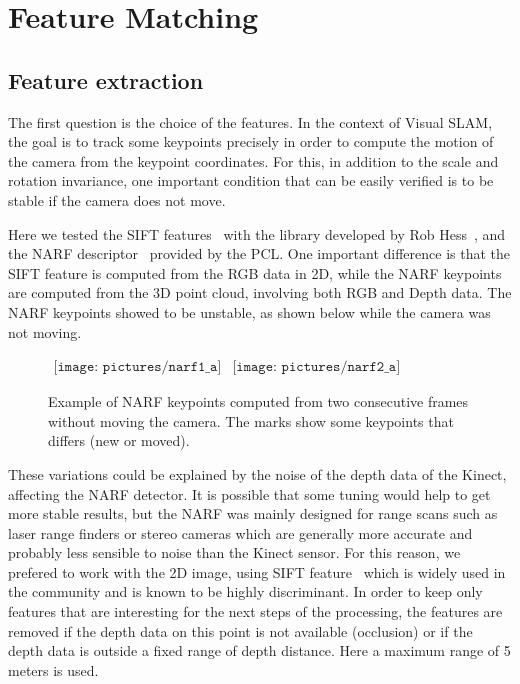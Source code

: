 \chapter{Feature Matching}
\label{chap:features}

\section{Feature extraction}

The first question is the choice of the features. In the context of Visual SLAM, the goal is to track some keypoints precisely in order to compute the motion of the camera from the keypoint coordinates. For this, in addition to the scale and rotation invariance, one important condition that can be easily verified is to be stable if the camera does not move. 

Here we tested the SIFT features~\cite{lowe_2004_sift} with the library developed by Rob Hess~\cite{hess_sift}, and the NARF descriptor~\cite{steder10irosws} provided by the PCL. One important difference is that the SIFT feature is computed from the RGB data in 2D, while the NARF keypoints are computed from the 3D point cloud, involving both RGB and Depth data.
The NARF keypoints showed to be unstable, as shown below while the camera was not moving.

\begin{figure}[h!]
\centering$
\begin{array}{cc}
\texttt{[image: pictures/narf1\_a]} &
\texttt{[image: pictures/narf2\_a]}
\end{array}$
\caption{Example of NARF keypoints computed from two consecutive frames without moving the camera. The marks show some keypoints that differs (new or moved).}
\end{figure}

These variations could be explained by the noise of the depth data of the Kinect, affecting the NARF detector. It is possible that some tuning would help to get more stable results, but the NARF was mainly designed for range scans such as laser range finders or stereo cameras which are generally more accurate and probably less sensible to noise than the Kinect sensor. For this reason, we prefered to work with the 2D image, using SIFT feature~\cite{lowe_2004_sift} which is widely used in the community and is known to be highly discriminant. In order to keep only features that are interesting for the next steps of the processing, the features are removed if the depth data on this point is not available (occlusion) or if the depth data is outside a fixed range of depth distance. Here a maximum range of 5 meters is used.


